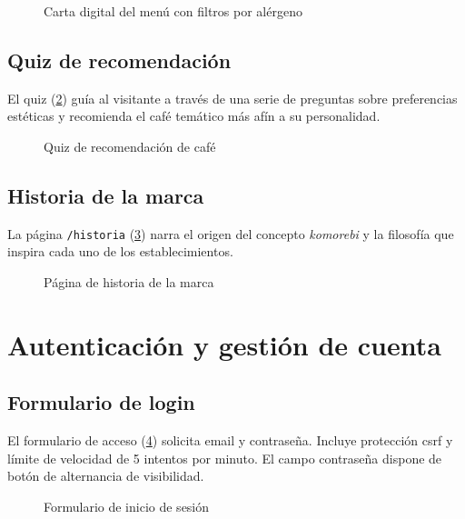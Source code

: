 \documentclass[12pt,a4paper,twoside,openright]{report}
\begin{document}
\begin{figure}[H]
  \centering
  \fbox{\rule{0pt}{6cm}\rule{12cm}{0pt}}
  \caption{Carta digital del menú con filtros por alérgeno}
  \label{fig:04-menu-catalogo}
\end{figure}

\subsection{Quiz de recomendación}
El quiz (\cref{fig:06-quiz-inicio}) guía al visitante a través de una serie de
preguntas sobre preferencias estéticas y recomienda el café temático más afín a su
personalidad.

\begin{figure}[H]
  \centering
  \fbox{\rule{0pt}{6cm}\rule{12cm}{0pt}}
  \caption{Quiz de recomendación de café}
  \label{fig:06-quiz-inicio}
\end{figure}

\subsection{Historia de la marca}
La página \texttt{/historia} (\cref{fig:08-historia}) narra el origen del concepto
\textit{komorebi} y la filosofía que inspira cada uno de los establecimientos.

\begin{figure}[H]
  \centering
  \fbox{\rule{0pt}{6cm}\rule{12cm}{0pt}}
  \caption{Página de historia de la marca}
  \label{fig:08-historia}
\end{figure}

\section{Autenticación y gestión de cuenta}
\label{sec:manual-auth}

\subsection{Formulario de login}
El formulario de acceso (\cref{fig:13-login-form}) solicita email y contraseña.
Incluye protección \gls{csrf} y límite de velocidad de 5 intentos por minuto.
El campo contraseña dispone de botón de alternancia de visibilidad.

\begin{figure}[H]
  \centering
  \fbox{\rule{0pt}{6cm}\rule{12cm}{0pt}}
  \caption{Formulario de inicio de sesión}
  \label{fig:13-login-form}
\end{figure}
\end{document}
